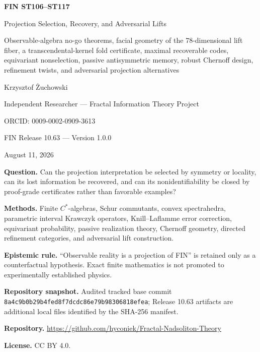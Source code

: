 \documentclass[11pt,a4paper]{article}
\begin{document}
\begin{titlepage}
\centering
\vspace*{1.0cm}
{\LARGE\bfseries FIN ST106--ST117\par}
\vspace{0.32cm}
{\Large Projection Selection, Recovery, and Adversarial Lifts\par}
\vspace{0.42cm}
{\large Observable-algebra no-go theorems, facial geometry of the 78-dimensional lift fiber, a transcendental-kernel fold certificate, maximal recoverable codes, equivariant nonselection, passive antisymmetric memory, robust Chernoff design, refinement twists, and adversarial projection alternatives\par}
\vspace{0.85cm}
{\Large Krzysztof \.{Z}uchowski\par}
\vspace{0.20cm}
{\large Independent Researcher --- Fractal Information Theory Project\par}
{\large ORCID: 0009-0002-0909-3613\par}
\vspace{0.65cm}
{\large FIN Release 10.63 --- Version 1.0.0\par}
{\large August 11, 2026\par}
\vfill
\begin{minipage}{0.91\textwidth}
\textbf{Question.} Can the projection interpretation be selected by symmetry or locality, can its lost information be recovered, and can its nonidentifiability be closed by proof-grade certificates rather than favorable examples?\par
\textbf{Methods.} Finite $C^*$-algebras, Schur commutants, convex spectrahedra, parametric interval Krawczyk operators, Knill--Laflamme error correction, equivariant probability, passive realization theory, Chernoff geometry, directed refinement categories, and adversarial lift construction.\par
\textbf{Epistemic rule.} ``Observable reality is a projection of FIN'' is retained only as a counterfactual hypothesis. Exact finite mathematics is not promoted to experimentally established physics.\par
\textbf{Repository snapshot.} Audited tracked base commit \texttt{8a4c9b0b29b4fed8f7dcdc86e79b98306818efea}; Release 10.63 artifacts are additional local files identified by the SHA-256 manifest.\par
\textbf{Repository.} \url{https://github.com/hyconiek/Fractal-Nadsoliton-Theory}\par
\textbf{License.} CC BY 4.0.
\end{minipage}
\end{titlepage}
\end{document}
